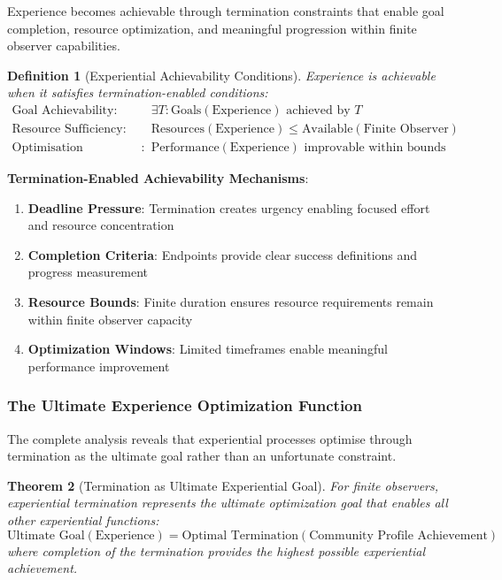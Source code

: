 \documentclass{article}
\newtheorem{theorem}{Theorem}[section]
\newtheorem{definition}[theorem]{Definition}
\begin{document}
Experience becomes achievable through termination constraints that enable goal completion, resource optimization, and meaningful progression within finite observer capabilities.

\begin{definition}[Experiential Achievability Conditions]
Experience is achievable when it satisfies termination-enabled conditions:
\begin{align}
\text{Goal Achievability}: \quad &\exists T: \text{Goals}(\text{Experience}) \text{ achieved by } T \\
\text{Resource Sufficiency}: \quad &\text{Resources}(\text{Experience}) \leq \text{Available}(\text{Finite Observer}) \\
\text{Optimisation Possibility}: \quad &\text{Performance}(\text{Experience}) \text{ improvable within bounds}
\end{align}
\end{definition}

\textbf{Termination-Enabled Achievability Mechanisms}:

\begin{enumerate}
\item \textbf{Deadline Pressure}: Termination creates urgency enabling focused effort and resource concentration
\item \textbf{Completion Criteria}: Endpoints provide clear success definitions and progress measurement
\item \textbf{Resource Bounds}: Finite duration ensures resource requirements remain within finite observer capacity
\item \textbf{Optimization Windows}: Limited timeframes enable meaningful performance improvement
\end{enumerate}

\subsubsection{The Ultimate Experience Optimization Function}

The complete analysis reveals that experiential processes optimise through termination as the ultimate goal rather than an unfortunate constraint.

\begin{theorem}[Termination as Ultimate Experiential Goal]
\label{thm:termination_ultimate_goal}
For finite observers, experiential termination represents the ultimate optimization goal that enables all other experiential functions:
\begin{equation}
\text{Ultimate Goal}(\text{Experience}) = \text{Optimal Termination}(\text{Community Profile Achievement})
\end{equation}
where completion of the termination provides the highest possible experiential achievement.
\end{theorem}
\end{document}

